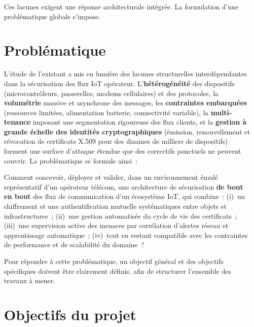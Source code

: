 Ces lacunes exigent une réponse architecturale intégrée. La formulation d'une problématique globale s'impose.

\section{Problématique}
\label{sec:problematique}

L'étude de l'existant a mis en lumière des lacunes structurelles interdépendantes dans la sécurisation des flux IoT opérateur. L'\textbf{hétérogénéité} des dispositifs (microcontrôleurs, passerelles, modems cellulaires) et des protocoles, la \textbf{volumétrie} massive et asynchrone des messages, les \textbf{contraintes embarquées} (ressources limitées, alimentation batterie, connectivité variable), la \textbf{multi-tenance} imposant une segmentation rigoureuse des flux clients, et la \textbf{gestion à grande échelle des identités cryptographiques} (émission, renouvellement et révocation de certificats X.509 pour des dizaines de milliers de dispositifs) forment une surface d'attaque étendue que des correctifs ponctuels ne peuvent couvrir. La problématique se formule ainsi~:

\begin{infobox}[Problématique]
Comment concevoir, déployer et valider, dans un environnement émulé représentatif d'un opérateur télécom, une architecture de sécurisation \textbf{de bout en bout} des flux de communication d'un écosystème IoT, qui combine~: (i)~un chiffrement et une authentification mutuelle systématiques entre objets et infrastructures~; (ii)~une gestion automatisée du cycle de vie des certificats~; (iii)~une supervision active des menaces par corrélation d'alertes réseau et apprentissage automatique~; (iv)~tout en restant compatible avec les contraintes de performance et de scalabilité du domaine~?
\end{infobox}

Pour répondre à cette problématique, un objectif général et des objectifs spécifiques doivent être clairement définis, afin de structurer l'ensemble des travaux à mener.

\section{Objectifs du projet}

